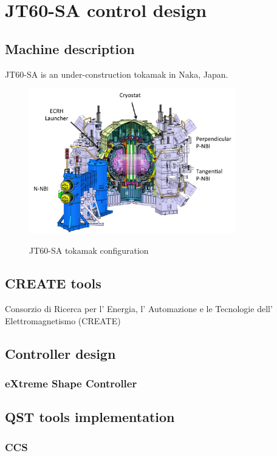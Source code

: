 \chapter{JT60-SA control design}

\section{Machine description}

JT60-SA is an under-construction tokamak in Naka, Japan.

\begin{figure}
	\centering
	\includegraphics[width=0.80\textwidth]{Chp3/JT60SA.png}
	\label{JT60schm}
	\caption{JT60-SA tokamak configuration}
\end{figure}

\section{CREATE tools}
Consorzio di Ricerca per l' Energia, l' Automazione e le Tecnologie dell' Elettromagnetismo (CREATE)

\section{Controller design}
\subsection{eXtreme Shape Controller}
\section{QST tools implementation}
\subsection{CCS}
